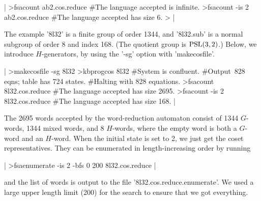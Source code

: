 |
 >fsacount ab2.cos.reduce
#The language accepted is infinite.
 >fsacount -is 2 ab2.cos.reduce
#The language accepted has size 6.
 >
|

The example '8l32' is a finite group of order 1344, and '8l32.sub' is a
normal subgroup of order 8 and index 168. (The quotient group is
${\rm PSL}(3,2)$.) Below, we introduce $H$-generators, by using the '-sg'
option with 'makecosfile'.

|
 >makecosfile -sg 8l32
 >kbprogcos 8l32
#System is confluent.
#Output\:\ 828 eqns; table has 724 states.
#Halting with 828 equations.
 >fsacount 8l32.cos.reduce
#The language accepted has size 2695.
 >fsacount -is 2 8l32.cos.reduce
#The language accepted has size 168.
|

The 2695 words accepted by the word-reduction automaton consist of 1344
$G$-words, 1344 mixed words, and 8 $H$-words, where the empty word is both
a $G$-word and an $H$-word. When the initial state is set to 2, we just get
the coset representatives. They can be enumerated in length-increasing
order by running

|
 >fsaenumerate -is 2 -bfs 0 200 8l32.cos.reduce
|

and the list of words is output to the file '8l32.cos.reduce.enumerate'.
We used a large upper length limit (200) for the search to ensure that we got
everything.
